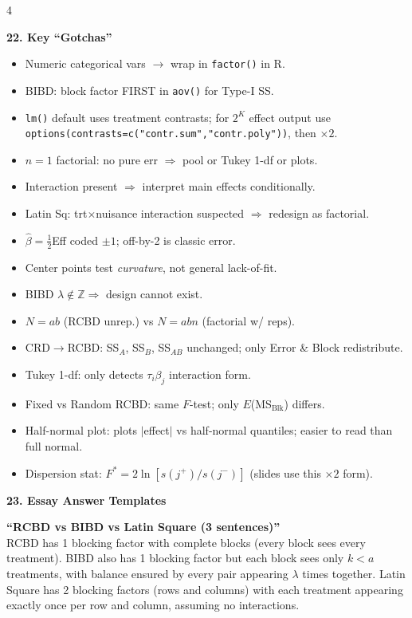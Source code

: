 \documentclass[7pt,letterpaper,landscape]{extarticle}
\newcommand{\secbar}[1]{%
  \vspace{2pt}%
  {\colorbox{black!80}{\parbox{\dimexpr\linewidth-2\fboxsep}{\color{white}\small\bfseries #1}}}\par%
  \vspace{1pt}%
}
\begin{document}
\begin{multicols*}{4}
\secbar{22. Key ``Gotchas''}
\begin{itemize}[leftmargin=10pt]
\item Numeric categorical vars $\to$ wrap in \texttt{factor()} in R.
\item BIBD: block factor FIRST in \texttt{aov()} for Type-I SS.
\item \texttt{lm()} default uses treatment contrasts; for $2^K$ effect output use \texttt{options(contrasts=c("contr.sum","contr.poly"))}, then $\times2$.
\item $n{=}1$ factorial: no pure err $\Rightarrow$ pool or Tukey 1-df or plots.
\item Interaction present $\Rightarrow$ interpret main effects conditionally.
\item Latin Sq: trt$\times$nuisance interaction suspected $\Rightarrow$ redesign as factorial.
\item $\hat\beta{=}\tfrac12$Eff coded $\pm1$; off-by-2 is classic error.
\item Center points test \emph{curvature}, not general lack-of-fit.
\item BIBD $\lambda{\notin}\mathbb Z\Rightarrow$ design cannot exist.
\item $N{=}ab$ (RCBD unrep.) vs $N{=}abn$ (factorial w/ reps).
\item CRD$\to$RCBD: SS$_A$, SS$_B$, SS$_{AB}$ unchanged; only Error \& Block redistribute.
\item Tukey 1-df: only detects $\tau_i\beta_j$ interaction form.
\item Fixed vs Random RCBD: same $F$-test; only $E$(MS$_{\text{Blk}}$) differs.
\item Half-normal plot: plots $|$effect$|$ vs half-normal quantiles; easier to read than full normal.
\item Dispersion stat: $F^*{=}2\ln[s(j^+)/s(j^-)]$ (slides use this $\times2$ form).
\end{itemize}

\secbar{23. Essay Answer Templates}
{\scriptsize
\textbf{``RCBD vs BIBD vs Latin Square (3 sentences)''}\\
RCBD has 1 blocking factor with complete blocks (every block sees every treatment). BIBD also has 1 blocking factor but each block sees only $k<a$ treatments, with balance ensured by every pair appearing $\lambda$ times together. Latin Square has 2 blocking factors (rows and columns) with each treatment appearing exactly once per row and column, assuming no interactions.

}
\end{multicols*}
\end{document}
